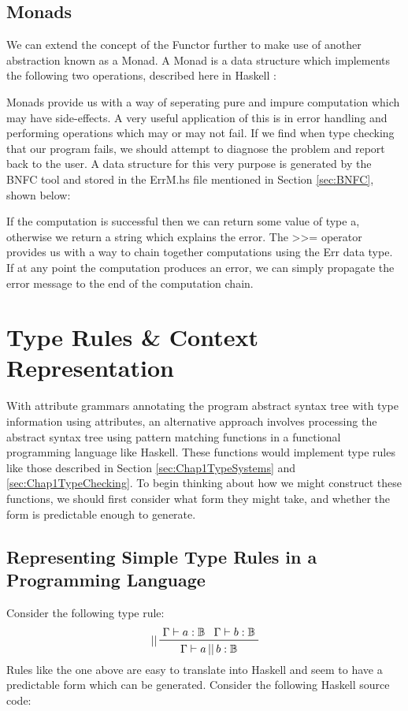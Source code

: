 \documentclass{UoYCSproject}
\begin{document}
\subsection{Monads}
We can extend the concept of the Functor further to make use of another
abstraction known as a Monad. A Monad is a data structure which implements the
following two operations, described here in Haskell \cite{HuttonHaskell}:

Monads provide us with a way of seperating pure and impure computation which
may have side-effects. A very useful application of this is in error handling
and performing operations which may or may not fail. If we find when type
checking that our program fails, we should attempt to diagnose the problem and
report back to the user. A data structure for this very purpose is generated by
the BNFC tool and stored in the {\ttfamily ErrM.hs} file mentioned in Section
\ref{sec:BNFC}, shown below:

If the computation is successful then we can return some value of type
{\ttfamily a}, otherwise we return a string which explains the error. The
{\ttfamily >>=} operator provides us with a way to chain together computations 
using the {\ttfamily Err} data type. If at any point the computation produces an
error, we can simply propagate the error message to the end of the computation
chain. 

\section{Type Rules \& Context Representation}
With attribute grammars annotating the program abstract syntax tree with type
information using attributes, an alternative approach involves processing the
abstract syntax tree using pattern matching functions in a functional programming
language like Haskell. These functions would implement type rules like those
described in Section \ref{sec:Chap1TypeSystems} and \ref{sec:Chap1TypeChecking}.
To begin thinking about how we might construct these functions, we should first
consider what form they might take, and whether the form is predictable enough
to generate.

\subsection{Representing Simple Type Rules in a Programming Language}
Consider the following type rule:
\begin{displaymath}
    \prftree[l]{||}{\Gamma \vdash a:\mathbb{B}}{\Gamma \vdash b:\mathbb{B}}{
    \Gamma \vdash a \, || \, b:\mathbb{B}}
\end{displaymath}
Rules like the one above are easy to translate into
Haskell and seem to have a predictable form which can be generated. Consider
the following Haskell source code:

\end{document}
